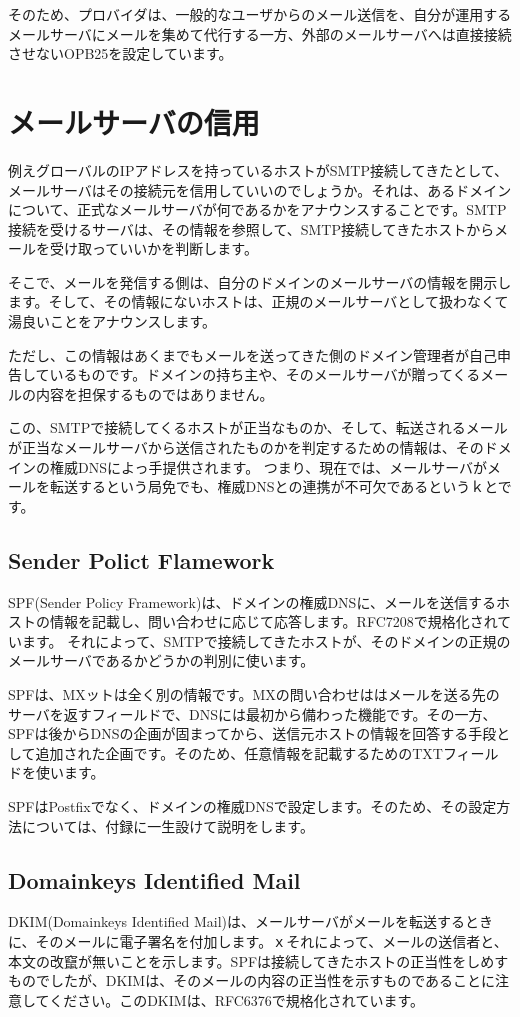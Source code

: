 {そのため、プロバイダは、一般的なユーザからのメール送信を、自分が運用するメールサーバにメールを集めて代行する一方、外部のメールサーバへは直接接続させないOPB25を設定しています。

\section{メールサーバの信用}

例えグローバルのIPアドレスを持っているホストがSMTP接続してきたとして、メールサーバはその接続元を信用していいのでしょうか。それは、あるドメインについて、正式なメールサーバが何であるかをアナウンスすることです。SMTP接続を受けるサーバは、その情報を参照して、SMTP接続してきたホストからメールを受け取っていいかを判断します。

そこで、メールを発信する側は、自分のドメインのメールサーバの情報を開示します。そして、その情報にないホストは、正規のメールサーバとして扱わなくて湯良いことをアナウンスします。

ただし、この情報はあくまでもメールを送ってきた側のドメイン管理者が自己申告しているものです。ドメインの持ち主や、そのメールサーバが贈ってくるメールの内容を担保するものではありません。

この、SMTPで接続してくるホストが正当なものか、そして、転送されるメールが正当なメールサーバから送信されたものかを判定するための情報は、そのドメインの権威DNSによっ手提供されます。
つまり、現在では、メールサーバがメールを転送するという局免でも、権威DNSとの連携が不可欠であるというｋとです。

\subsection{Sender Polict Flamework}
SPF(Sender Policy Framework)は、ドメインの権威DNSに、メールを送信するホストの情報を記載し、問い合わせに応じて応答します。RFC7208で規格化されています。
それによって、SMTPで接続してきたホストが、そのドメインの正規のメールサーバであるかどうかの判別に使います。

SPFは、MXットは全く別の情報です。MXの問い合わせははメールを送る先のサーバを返すフィールドで、DNSには最初から備わった機能です。その一方、SPFは後からDNSの企画が固まってから、送信元ホストの情報を回答する手段として追加された企画です。そのため、任意情報を記載するためのTXTフィールドを使います。

SPFはPostfixでなく、ドメインの権威DNSで設定します。そのため、その設定方法については、付録に一生設けて説明をします。

\subsection{Domainkeys Identified Mail}
DKIM(Domainkeys Identified Mail)は、メールサーバがメールを転送するときに、そのメールに電子署名を付加します。ｘそれによって、メールの送信者と、本文の改竄が無いことを示します。SPFは接続してきたホストの正当性をしめすものでしたが、DKIMは、そのメールの内容の正当性を示すものであることに注意してください。このDKIMは、RFC6376で規格化されています。

}
